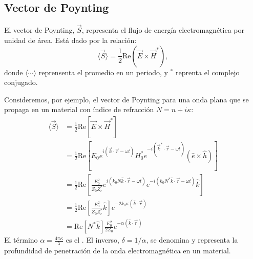 \documentclass[letterpaper,10pt,english]{jupyterBook}
\let\sphinxpxdimen\pdfpxdimen\else\newdimen\sphinxpxdimen
\begin{document}
\noindent{\hspace*{\fill}\sphinxincludegraphics[width=400\sphinxpxdimen]{{em_wave_decaying}.jpg}\hspace*{\fill}}




\subsection{Vector de Poynting}
\label{\detokenize{2_ondas_EM_en_la_materia/2_ondas_EM_en_la_materia:vector-de-poynting}}
\sphinxAtStartPar
El vector de Poynting, \(\vec{S}\), representa el flujo de energía electromagnética por unidad de área. Está dado por la relación:
\label{equation:2_ondas_EM_en_la_materia/2_ondas_EM_en_la_materia:e263de16-8406-447f-bf47-196e49763a2d}\begin{equation}
\langle\vec{S}\rangle = \frac{1}{2}\mathrm{Re}\left(\vec{E}\times\vec{H}^*\right),
\end{equation}
\sphinxAtStartPar
donde \(\langle\cdots\rangle\) reprensenta el promedio en un periodo, y \(^*\) reprenta el complejo conjugado.

\sphinxAtStartPar
Consideremos, por ejemplo, el vector de Poynting para una onda plana que se propaga en un material con índice de refracción \(N = n+i\kappa\):
\begin{align*}
\langle\vec{S}\rangle &= \frac{1}{2}\mathrm{Re}\left[\vec{E}\times\vec{H}^*\right] \\
&=\frac{1}{2}\mathrm{Re}\left[E_0 e^{i\left(\vec{k}\cdot\vec{r} - \omega t\right)}H_0^* e^{-i\left(\vec{k}^*\cdot\vec{r} - \omega t\right)}\left(\hat{e}\times\hat{h}\right)\right] \\
&=\frac{1}{2}\mathrm{Re}\left[\frac{E_0^2}{Z_0Z_r^*} e^{i\left(k_0N\hat{k}\cdot\vec{r} - \omega t\right)}e^{-i\left(k_0N^*\hat{k}\cdot\vec{r} - \omega t\right)} \hat{k}\right] \\
&=\frac{1}{2}\mathrm{Re}\left[\frac{E_0^2}{Z_0Z_r^*}  \hat{k}\right]e^{-2k_0\kappa\left(\hat{k}\cdot\vec{r}\right)} \\
&=\mathrm{Re}\left[N^*\hat{k}\right]\frac{E_0^2}{2Z_0}e^{-\alpha\left(\hat{k}\cdot\vec{r}\right)}
\end{align*}
\sphinxAtStartPar
El término \(\alpha = \frac{4\pi\kappa}{\lambda}\) es el . El inverso, \(\delta = 1/\alpha\), se denomina  y representa la profundidad de penetración de la onda electromagnética en un material.
\end{document}
